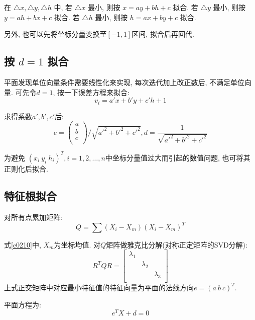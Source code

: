 在 $\triangle x, \triangle y, \triangle h$ 中, 若 $\triangle x$ 最小, 则按 $x=ay+bh+c$ 拟合. 若 $\triangle y$ 最小, 则按 $y=ah+bx+c$ 拟合. 若 $\triangle h$ 最小, 则按 $h=ax+by+c$ 拟合.

另外, 也可以先将坐标分量变换至$[-1,1]$区间, 拟合后再回代.

\subsection{按 \texorpdfstring{$d=1$}{d=1}  拟合}
平面发现单位向量条件需要线性化来实现, 每次迭代加上改正数后, 不满足单位向量. 可先令$d=1$, 按一下误差方程来拟合:
\begin{equation}
    v_i = a'x+b'y+c'h+1
\end{equation}

求得系数$a',b',c'$后:
\begin{equation}
    e=
    \begin{pmatrix}
        a\\
        b\\
        c\\
    \end{pmatrix}
    /\sqrt{a'^2+b'^2+c'^2},d=\frac{1}{\sqrt{a'^2+b'^2+c'^2}}
\end{equation}

为避免 $(x_i\ y_i\ h_i)^T, i=1,2,\ldots,n$中坐标分量值过大而引起的数值问题, 也可将其正则化后拟合.

\subsection{特征根拟合} \label{evfit}
对所有点累加矩阵:
\begin{equation}
    Q=\sum (X_i-X_m)(X_i-X_m)^T \label{e0210}
\end{equation}

式\eqref{e0210}中, $X_m$为坐标均值. 对$Q$矩阵做雅克比分解(对称正定矩阵的SVD分解):
\begin{equation}
    R^TQR=
    \begin{bmatrix}
        \lambda_1 & & \\
        & \lambda_2 & \\
        & & \lambda_3 \\
    \end{bmatrix}
    \label{e0211}
\end{equation}
上式正交矩阵中对应最小特征值的特征向量为平面的法线方向$e=(a\  b\ c)^T$.

平面方程为:
\begin{equation}
    e^TX+d=0
\end{equation}


